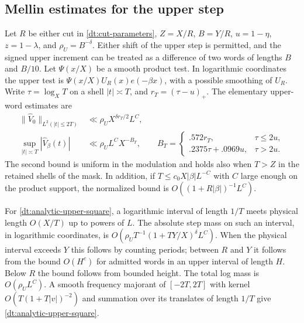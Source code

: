 \documentclass[11pt,a4paper]{article}
\theoremstyle{paperplain}
\numberwithin{equation}{section}
\begin{document}
\subsection{Mellin estimates for the upper step}

Let \(R\) be either cut in \eqref{dt:cut-parameters},
\(Z=X/R\), \(B=Y/R\), \(u=1-\eta\), \(z=1-\lambda\), and
\(\rho_U=B^{-\delta}\). Either shift of the upper step is permitted,
and the signed upper increment can be treated as a difference of
two words of lengths \(B\) and \(B/10\). Let \(\Psi(x/X)\) be a
smooth product test. In logarithmic coordinates the upper test is
\(\Psi(x/X)U_R(x)e(-\beta x)\), with a possible smoothing of \(U_R\).
Write \(\tau=\log_X T\) on a shell \(|t|\asymp T\), and
\(r_T=(\tau-u)_+\). The elementary upper-word estimates are
\begin{align}
 \|\widehat V_0\|_{L^2(|t|\le 2T)}
    &\ll \rho_U X^{\delta r_T/2}L^C, \label{dt:analytic-upper-square}\\
 \sup_{|t|\asymp T}|\widehat V_\beta(t)|
    &\ll \rho_U L^C X^{-B_T},
 \qquad B_T=
 \begin{cases}
  .572r_T,&\tau\le 2u,\\
  .2375\tau+.0969u,&\tau>2u .
 \end{cases} \label{dt:analytic-upper-point}
\end{align}
The second bound is uniform in the modulation and holds also when
\(T>Z\) in the retained shells of the mask. In addition, if
\(T\le c_0 X|\beta| L^{-C}\) with \(C\) large enough on the
product support, the normalized bound is
\(O((1+R|\beta|)^{-1}L^C)\).

For \eqref{dt:analytic-upper-square}, a logarithmic interval of
length \(1/T\) meets physical length \(O(X/T)\) up to powers of \(L\).
The absolute step mass on such an interval, in logarithmic coordinates,
is \(O(\rho_U T^{-1}(1+TY/X)^\delta L^C)\). When the physical interval
exceeds \(Y\) this follows by counting periods; between \(R\) and \(Y\)
it follows from the bound \(O(H^c)\) for admitted words in an upper
interval of length \(H\). Below \(R\) the bound follows from bounded
height. The total log mass is \(O(\rho_U L^C)\). A smooth frequency
majorant of \([-2T,2T]\) with kernel \(O(T(1+T|v|)^{-2})\) and
summation over its translates of length \(1/T\) give
\eqref{dt:analytic-upper-square}.
\end{document}
